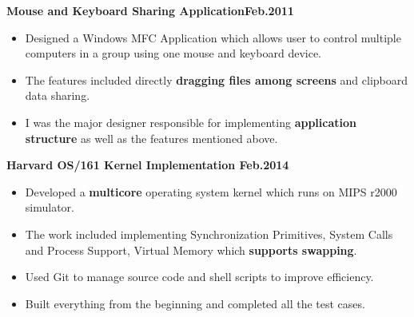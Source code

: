 \documentclass{myres}
\begin{document}
{
	\par
	\textbf{Mouse and Keyboard Sharing Application\hfill Feb.2011}
	\begin{itemize}[topsep=0pt, leftmargin=0.2in] \itemsep -5pt
		\item Designed a Windows MFC Application which allows user to control multiple computers in a group using one mouse and keyboard device. 
		\item The features included directly \textbf{dragging files among screens} and clipboard data sharing. 
		\item I was the major designer responsible for implementing \textbf{application structure} as well as the
					features mentioned above.
	\end{itemize}

	\par
	\smallskip



	\textbf{Harvard OS/161 Kernel Implementation \hfill Feb.2014}
	\begin{itemize}[topsep=0pt, leftmargin=0.2in] \itemsep -5pt
			\item Developed a \textbf{multicore} operating system kernel which runs on MIPS r2000 simulator.
		\item The work included implementing Synchronization Primitives, System Calls and Process Support, Virtual Memory
			which \textbf{supports swapping}.
		\item Used Git to manage source code and shell scripts to improve efficiency.
		\item Built everything from the beginning and completed all the test cases. 
	\end{itemize}

	\par
	\smallskip

}
\end{document}
